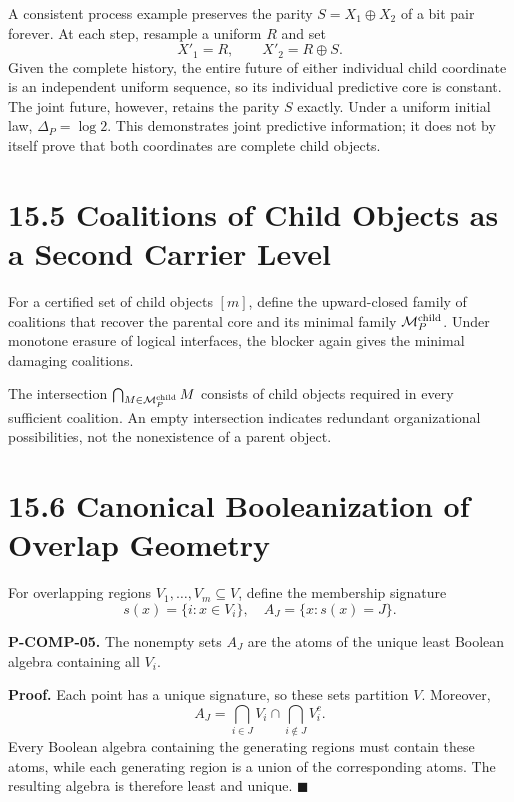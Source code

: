\documentclass[
  english,
  11pt,
  oneside]{book}
\newcounter{none} %
\begin{document}
A consistent process example preserves the parity \(S=X_1\oplus X_2\) of a bit pair forever. At each step, resample a uniform \(R\) and set \[X'_1=R,\qquad X'_2=R\oplus S.\] Given the complete history, the entire future of either individual child coordinate is an independent uniform sequence, so its individual predictive core is constant. The joint future, however, retains the parity \(S\) exactly. Under a uniform initial law, \(\Delta_P=\log2\). This demonstrates joint predictive information; it does not by itself prove that both coordinates are complete child objects.

\section{15.5 Coalitions of Child Objects as a Second Carrier Level}\label{coalitions-of-child-objects-as-a-second-carrier-level}

For a certified set of child objects \([m]\), define the upward-closed family of coalitions that recover the parental core and its minimal family \(\mathcal M_P^{\rm child}\). Under monotone erasure of logical interfaces, the blocker again gives the minimal damaging coalitions.

The intersection \(\bigcap_{M\in\mathcal M_P^{\rm child}}M\) consists of child objects required in every sufficient coalition. An empty intersection indicates redundant organizational possibilities, not the nonexistence of a parent object.

\section{15.6 Canonical Booleanization of Overlap Geometry}\label{canonical-booleanization-of-overlap-geometry}

For overlapping regions \(V_1,\ldots,V_m\subseteq V\), define the membership signature \[s(x)=\{i:x\in V_i\},\quad A_J=\{x:s(x)=J\}.\]

\hypertarget{p-comp-05}{}\label{p-comp-05}

\textbf{P-COMP-05.} The nonempty sets \(A_J\) are the atoms of the unique least Boolean algebra containing all \(V_i\).

\textbf{Proof.} Each point has a unique signature, so these sets partition \(V\). Moreover, \[A_J=\bigcap_{i\in J}V_i\cap\bigcap_{i\notin J}V_i^c.\] Every Boolean algebra containing the generating regions must contain these atoms, while each generating region is a union of the corresponding atoms. The resulting algebra is therefore least and unique. \(\blacksquare\)
\end{document}
